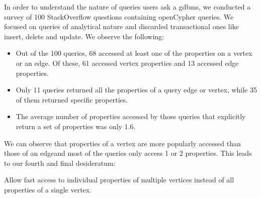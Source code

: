 \begin{guideline}
	In order to understand the nature of queries users ask a \gls{gdbms}, we conducted a survey of 100 StackOverflow questions containing openCypher queries. We focused on queries of analytical nature and discarded transactional ones like insert, delete and update. We observe the following: 
	
	
	\begin{itemize}
		
		\item Out of the 100 queries, 68 accessed at least one of the properties on a vertex or an edge. Of these, 61 accessed vertex properties and 13 accessed edge properties.
		
		\item Only 11 queries returned all the properties of a query edge or vertex, while 35 of them returned specific properties.
		
		\item The average number of properties accessed by those queries that explicitly return a set of properties was only 1.6.
		
	\end{itemize}
	
	We can observe that properties of a vertex are more popularly accessed than those of an edgeand most of the queries only access 1 or 2 properties. This leads to our fourth and final desideratum:
	
	\begin{desideratum}
		Allow fast access to individual properties of multiple vertices instead of all properties of a single vertex.
	\end{desideratum}
	
\end{guideline}
